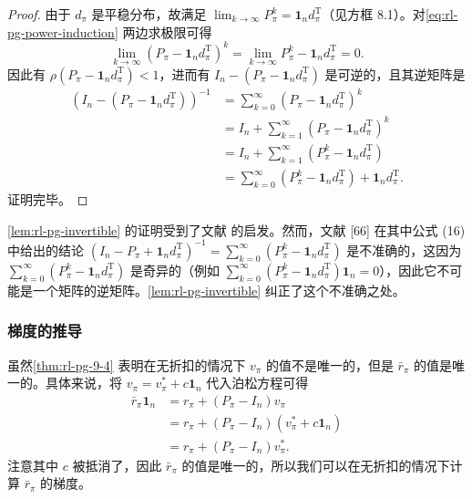 \begin{note}
\begin{proof}
由于 $d_{\pi}$ 是平稳分布，故满足 $\lim_{k\to \infty}P_{\pi}^{k} = \mathbf{1}_n d_{\pi}^{\mathrm{T}}$（见方框 8.1）。对\cref{eq:rl-pg-power-induction} 两边求极限可得
\begin{equation}
\lim_{k \to \infty} (P_{\pi} - \mathbf{1}_n d_{\pi}^{\mathrm{T}})^{k} = \lim_{k \to \infty} P_{\pi}^{k} - \mathbf{1}_n d_{\pi}^{\mathrm{T}} = 0.
\end{equation}
因此有 $\rho(P_{\pi} - \mathbf{1}_n d_{\pi}^{\mathrm{T}}) < 1$，进而有 $I_n - (P_{\pi} - \mathbf{1}_n d_{\pi}^{\mathrm{T}})$ 是可逆的，且其逆矩阵是
\begin{equation}
\begin{aligned}
(I_n - (P_{\pi} - \mathbf{1}_n d_{\pi}^{\mathrm{T}}))^{-1} &= \sum_{k=0}^{\infty} (P_{\pi} - \mathbf{1}_n d_{\pi}^{\mathrm{T}})^{k} \\
&= I_n + \sum_{k=1}^{\infty} (P_{\pi} - \mathbf{1}_n d_{\pi}^{\mathrm{T}})^{k} \\
&= I_n + \sum_{k=1}^{\infty} (P_{\pi}^{k} - \mathbf{1}_n d_{\pi}^{\mathrm{T}}) \\
&= \sum_{k=0}^{\infty} (P_{\pi}^{k} - \mathbf{1}_n d_{\pi}^{\mathrm{T}}) + \mathbf{1}_n d_{\pi}^{\mathrm{T}}.
\end{aligned}
\end{equation}
证明完毕。
\end{proof}

\cref{lem:rl-pg-invertible} 的证明受到了文献  的启发。然而，文献 [66] 在其中公式 (16) 中给出的结论 $(I_n - P_{\pi} + \mathbf{1}_n d_{\pi}^{\mathrm{T}})^{-1} = \sum_{k=0}^{\infty}(P_{\pi}^{k} - \mathbf{1}_n d_{\pi}^{\mathrm{T}})$ 是不准确的，这因为 $\sum_{k=0}^{\infty}(P_{\pi}^{k} - \mathbf{1}_n d_{\pi}^{\mathrm{T}})$ 是奇异的（例如 $\sum_{k=0}^{\infty}(P_{\pi}^{k} - \mathbf{1}_n d_{\pi}^{\mathrm{T}})\mathbf{1}_n = 0$），因此它不可能是一个矩阵的逆矩阵。\cref{lem:rl-pg-invertible} 纠正了这个不准确之处。
\end{note}

\subsubsection*{梯度的推导}

虽然\cref{thm:rl-pg-9-4} 表明在无折扣的情况下 $v_{\pi}$ 的值不是唯一的，但是 $\bar{r}_{\pi}$ 的值是唯一的。具体来说，将 $v_{\pi} = v_{\pi}^{*} + c\mathbf{1}_n$ 代入泊松方程可得
\begin{equation}
\begin{aligned}
\bar{r}_{\pi} \mathbf{1}_n &= r_{\pi} + (P_{\pi} - I_n) v_{\pi} \\
&= r_{\pi} + (P_{\pi} - I_n)(v_{\pi}^{*} + c \mathbf{1}_n) \\
&= r_{\pi} + (P_{\pi} - I_n) v_{\pi}^{*}.
\end{aligned}
\end{equation}
注意其中 $c$ 被抵消了，因此 $\bar{r}_{\pi}$ 的值是唯一的，所以我们可以在无折扣的情况下计算 $\bar{r}_{\pi}$ 的梯度。

